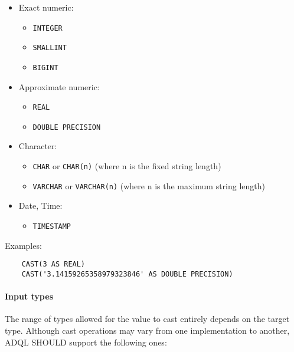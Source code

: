 \documentclass[11pt,a4paper]{ivoa}
\begin{document}
\begin{itemize}
    \item Exact numeric:
    \begin{itemize}
        \item \verb:INTEGER:
        \item \verb:SMALLINT:
        \item \verb:BIGINT:
    \end{itemize}
    \item Approximate numeric:
    \begin{itemize}
        \item \verb:REAL:
        \item \verb:DOUBLE PRECISION:
    \end{itemize}
    \item Character:
    \begin{itemize}
        \item \verb:CHAR: or \verb:CHAR(n): (where n is the fixed string length)
        \item \verb:VARCHAR: or \verb:VARCHAR(n): (where n is the maximum string length)
    \end{itemize}
    \item Date, Time:
    \begin{itemize}
        \item \verb:TIMESTAMP:
    \end{itemize}
\end{itemize}

Examples:

\begin{verbatim}
    CAST(3 AS REAL)
    CAST('3.14159265358979323846' AS DOUBLE PRECISION)
\end{verbatim}

\paragraph{Input types}

The range of types allowed for the value to cast entirely depends on the target
type. Although cast operations may vary from one implementation to another, ADQL
SHOULD support the following ones:
\end{document}
